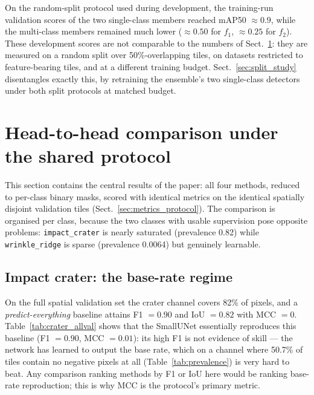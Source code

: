 \documentclass{aa}
\begin{document}
On the random-split protocol used during development, the training-run validation scores of the two single-class members reached mAP50 $\approx0.9$, while the multi-class members remained much lower (${\approx}0.50$ for $f_1$, ${\approx}0.25$ for $f_2$). These development scores are not comparable to the numbers of Sect.~\ref{sec:comparison}: they are measured on a random split over 50\%-overlapping tiles, on datasets restricted to feature-bearing tiles, and at a different training budget. Sect.~\ref{sec:split_study} disentangles exactly this, by retraining the ensemble's two single-class detectors under both split protocols at matched budget.


\FloatBarrier

\section{Head-to-head comparison under the shared protocol}
\label{sec:comparison}

This section contains the central results of the paper: all four methods, reduced to per-class binary masks, scored with identical metrics on the identical spatially disjoint validation tiles (Sect.~\ref{sec:metrics_protocol}). The comparison is organised per class, because the two classes with usable supervision pose opposite problems: \texttt{impact\_crater} is nearly saturated (prevalence 0.82) while \texttt{wrinkle\_ridge} is sparse (prevalence 0.0064) but genuinely learnable.

\subsection{Impact crater: the base-rate regime}
\label{sec:comp_crater}

On the full spatial validation set the crater channel covers 82\% of pixels, and a \emph{predict-everything} baseline attains F1 $=0.90$ and IoU $=0.82$ with MCC $=0$. Table~\ref{tab:crater_allval} shows that the SmallUNet essentially reproduces this baseline (F1 $=0.90$, MCC $=0.01$): its high F1 is not evidence of skill --- the network has learned to output the base rate, which on a channel where 50.7\% of tiles contain no negative pixels at all (Table~\ref{tab:prevalence}) is very hard to beat. Any comparison ranking methods by F1 or IoU here would be ranking base-rate reproduction; this is why MCC is the protocol's primary metric.
\end{document}
